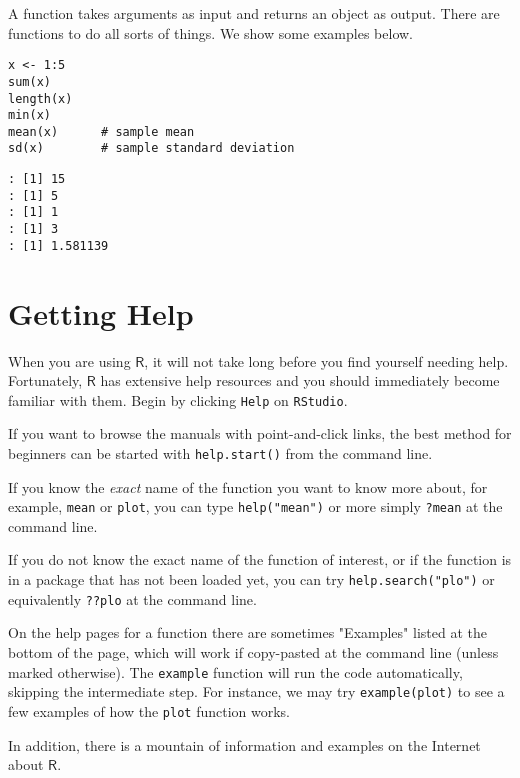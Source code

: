 A function takes arguments as input and returns an object as
output. There are functions to do all sorts of things. We show some
examples below.

\begin{Verbatim}
x <- 1:5
sum(x)
length(x)
min(x)
mean(x)      # sample mean
sd(x)        # sample standard deviation
\end{Verbatim}

\begin{verbatim}
: [1] 15
: [1] 5
: [1] 1
: [1] 3
: [1] 1.581139
\end{verbatim}

\section{Getting Help}
\label{sec-2-4}

When you are using \(\mathsf{R}\), it will not take long before you
find yourself needing help. Fortunately, \(\mathsf{R}\) has extensive
help resources and you should immediately become familiar with
them.
Begin by clicking \texttt{Help} on \texttt{RStudio}.

If you want to browse the manuals with point-and-click links, the best method for beginners can be started with \texttt{help.start()} from the command line.

If you know the
\emph{exact} name of the function you want to know more about, for
example, \texttt{mean} or \texttt{plot}, you can type \texttt{help("mean")} or more simply \texttt{?mean}  at the command line.

If you do not know the exact name of
the function of interest, or if the function is in a package that
has not been loaded yet, you can try \texttt{help.search("plo")}  or equivalently \texttt{??plo} at the command line.

On the help pages for a function there are sometimes "Examples"
listed at the bottom of the page, which will work if copy-pasted at
the command line (unless marked otherwise). The \texttt{example}
 function will run the code
automatically, skipping the intermediate step. For instance, we may
try \texttt{example(plot)} to see a few examples of how the \texttt{plot} function
works.

In addition, there is a mountain of information and examples on the Internet about
\(\mathsf{R}\).

